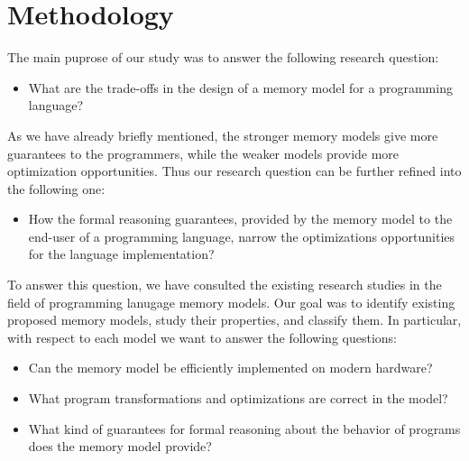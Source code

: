 \section{Methodology}
\label{sec:methodology}

The main puprose of our study was to answer the following research question:

\begin{itemize}
  \item What are the trade-offs in the design of a memory model for a programming language?
\end{itemize}

As we have already briefly mentioned, the stronger memory models 
give more guarantees to the programmers, while the weaker models 
provide more optimization opportunities. 
Thus our research question can be further refined into the following one:

\begin{itemize}
  \item How the formal reasoning guarantees, provided by the memory model 
    to the end-user of a programming language, narrow the 
    optimizations opportunities for the language implementation?
\end{itemize}

To answer this question, we have consulted the existing research studies 
in the field of programming lanugage memory models.
Our goal was to identify existing proposed memory models, 
study their properties, and classify them.
In particular, with respect to each model we want to answer the following questions:

\begin{itemize}
  
  \item Can the memory model be efficiently implemented on modern hardware? 

  \item What program transformations and optimizations are correct in the model? 

  \item What kind of guarantees for formal reasoning about the behavior 
    of programs does the memory model provide?
  
\end{itemize}

